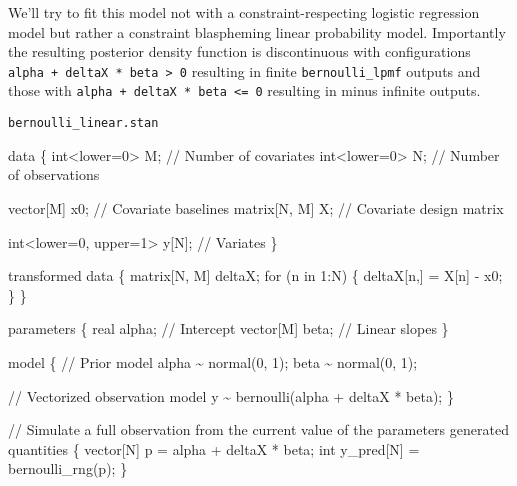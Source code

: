 \documentclass[
  letterpaper,
  DIV=11,
  numbers=noendperiod]{scrartcl}
\newenvironment{Shaded}{\begin{snugshade}}{\end{snugshade}}
\newcommand{\CommentTok}[1]{\textcolor[rgb]{0.37,0.37,0.37}{#1}}
\newcommand{\ControlFlowTok}[1]{\textcolor[rgb]{0.00,0.23,0.31}{#1}}
\newcommand{\DataTypeTok}[1]{\textcolor[rgb]{0.68,0.00,0.00}{#1}}
\newcommand{\DecValTok}[1]{\textcolor[rgb]{0.68,0.00,0.00}{#1}}
\newcommand{\KeywordTok}[1]{\textcolor[rgb]{0.00,0.23,0.31}{#1}}
\newcommand{\NormalTok}[1]{\textcolor[rgb]{0.00,0.23,0.31}{#1}}
\begin{document}
We'll try to fit this model not with a constraint-respecting logistic
regression model but rather a constraint blaspheming linear probability
model. Importantly the resulting posterior density function is
discontinuous with configurations
\texttt{alpha\ +\ deltaX\ *\ beta\ \textgreater{}\ 0} resulting in
finite \texttt{bernoulli\_lpmf} outputs and those with
\texttt{alpha\ +\ deltaX\ *\ beta\ \textless{}=\ 0} resulting in minus
infinite outputs.

\begin{codelisting}

\caption{\texttt{bernoulli\_linear.stan}}

\begin{Shaded}
\begin{Highlighting}[]
\KeywordTok{data}\NormalTok{ \{}
  \DataTypeTok{int}\NormalTok{\textless{}}\KeywordTok{lower}\NormalTok{=}\DecValTok{0}\NormalTok{\textgreater{} M; }\CommentTok{// Number of covariates}
  \DataTypeTok{int}\NormalTok{\textless{}}\KeywordTok{lower}\NormalTok{=}\DecValTok{0}\NormalTok{\textgreater{} N; }\CommentTok{// Number of observations}
  
  \DataTypeTok{vector}\NormalTok{[M] x0;   }\CommentTok{// Covariate baselines}
  \DataTypeTok{matrix}\NormalTok{[N, M] X; }\CommentTok{// Covariate design matrix}
  
  \DataTypeTok{int}\NormalTok{\textless{}}\KeywordTok{lower}\NormalTok{=}\DecValTok{0}\NormalTok{, }\KeywordTok{upper}\NormalTok{=}\DecValTok{1}\NormalTok{\textgreater{} y[N]; }\CommentTok{// Variates}
\NormalTok{\}}

\KeywordTok{transformed data}\NormalTok{ \{}
  \DataTypeTok{matrix}\NormalTok{[N, M] deltaX;}
  \ControlFlowTok{for}\NormalTok{ (n }\ControlFlowTok{in} \DecValTok{1}\NormalTok{:N) \{}
\NormalTok{    deltaX[n,] = X[n] {-} x0\textquotesingle{};}
\NormalTok{  \}}
\NormalTok{\}}

\KeywordTok{parameters}\NormalTok{ \{}
  \DataTypeTok{real}\NormalTok{ alpha;      }\CommentTok{// Intercept}
  \DataTypeTok{vector}\NormalTok{[M] beta;  }\CommentTok{// Linear slopes}
\NormalTok{\}}

\KeywordTok{model}\NormalTok{ \{}
  \CommentTok{// Prior model}
\NormalTok{  alpha \textasciitilde{} normal(}\DecValTok{0}\NormalTok{, }\DecValTok{1}\NormalTok{);}
\NormalTok{  beta \textasciitilde{} normal(}\DecValTok{0}\NormalTok{, }\DecValTok{1}\NormalTok{);}

  \CommentTok{// Vectorized observation model}
\NormalTok{  y \textasciitilde{} bernoulli(alpha + deltaX * beta);}
\NormalTok{\}}

\CommentTok{// Simulate a full observation from the current value of the parameters}
\KeywordTok{generated quantities}\NormalTok{ \{}
  \DataTypeTok{vector}\NormalTok{[N] p = alpha + deltaX * beta;}
  \DataTypeTok{int}\NormalTok{ y\_pred[N] = bernoulli\_rng(p);}
\NormalTok{\}}
\end{Highlighting}
\end{Shaded}

\end{codelisting}
\end{document}
